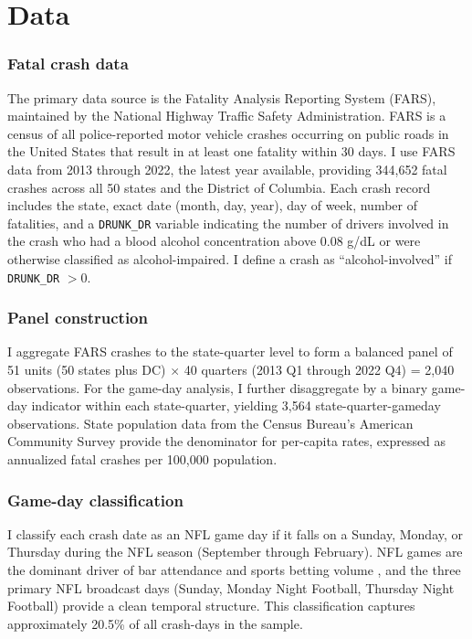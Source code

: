 \documentclass[12pt]{article}
\begin{document}
\section{Data}

\subsubsection*{Fatal crash data} The primary data source is the Fatality Analysis Reporting System (FARS), maintained by the National Highway Traffic Safety Administration. FARS is a census of all police-reported motor vehicle crashes occurring on public roads in the United States that result in at least one fatality within 30 days. I use FARS data from 2013 through 2022, the latest year available, providing 344,652 fatal crashes across all 50 states and the District of Columbia. Each crash record includes the state, exact date (month, day, year), day of week, number of fatalities, and a \texttt{DRUNK\_DR} variable indicating the number of drivers involved in the crash who had a blood alcohol concentration above 0.08 g/dL or were otherwise classified as alcohol-impaired. I define a crash as ``alcohol-involved'' if \texttt{DRUNK\_DR} $> 0$.

\subsubsection*{Panel construction} I aggregate FARS crashes to the state-quarter level to form a balanced panel of 51 units (50 states plus DC) $\times$ 40 quarters (2013 Q1 through 2022 Q4) = 2,040 observations. For the game-day analysis, I further disaggregate by a binary game-day indicator within each state-quarter, yielding 3,564 state-quarter-gameday observations. State population data from the Census Bureau's American Community Survey provide the denominator for per-capita rates, expressed as annualized fatal crashes per 100,000 population.

\subsubsection*{Game-day classification} I classify each crash date as an NFL game day if it falls on a Sunday, Monday, or Thursday during the NFL season (September through February). NFL games are the dominant driver of bar attendance and sports betting volume \citep{AGA2023}, and the three primary NFL broadcast days (Sunday, Monday Night Football, Thursday Night Football) provide a clean temporal structure. This classification captures approximately 20.5\% of all crash-days in the sample.
\end{document}
